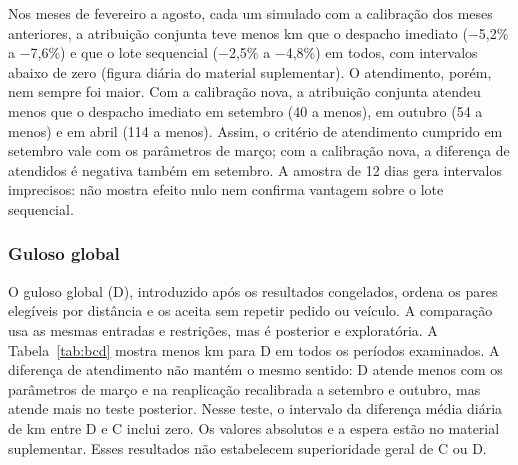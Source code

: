Nos meses de fevereiro a agosto, cada um simulado com a calibração dos meses anteriores, a atribuição conjunta teve menos km que o despacho imediato (−5,2\% a −7,6\%) e que o lote sequencial (−2,5\% a −4,8\%) em todos, com intervalos abaixo de zero (figura diária do material suplementar). O atendimento, porém, nem sempre foi maior. Com a calibração nova, a atribuição conjunta atendeu menos que o despacho imediato em setembro (40 a menos), em outubro (54 a menos) e em abril (114 a menos). Assim, o critério de atendimento cumprido em setembro vale com os parâmetros de março; com a calibração nova, a diferença de atendidos é negativa também em setembro. A amostra de 12 dias gera intervalos imprecisos: não mostra efeito nulo nem confirma vantagem sobre o lote sequencial.

\subsubsection*{Guloso global}

O guloso global (D), introduzido após os resultados congelados, ordena os pares elegíveis por distância e os aceita sem repetir pedido ou veículo. A comparação usa as mesmas entradas e restrições, mas é posterior e exploratória. A Tabela~\ref{tab:bcd} mostra menos km para D em todos os períodos examinados. A diferença de atendimento não mantém o mesmo sentido: D atende menos com os parâmetros de março e na reaplicação recalibrada a setembro e outubro, mas atende mais no teste posterior. Nesse teste, o intervalo da diferença média diária de km entre D e C inclui zero. Os valores absolutos e a espera estão no material suplementar. Esses resultados não estabelecem superioridade geral de C ou D.

